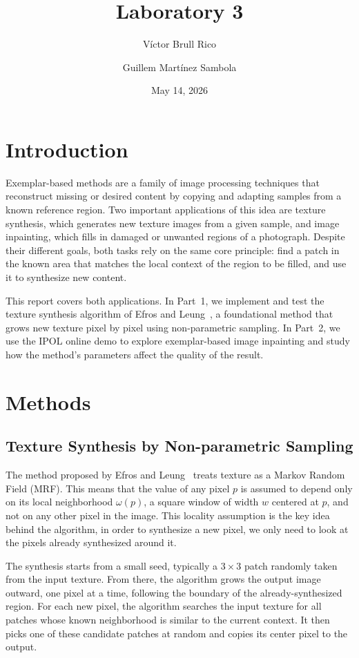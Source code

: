 \documentclass{article}
\title{Laboratory 3}
\author{Víctor Brull Rico \and Guillem Martínez Sambola}
\date{May 14, 2026}
\begin{document}
\maketitle

\section{Introduction}

Exemplar-based methods are a family of image processing techniques that reconstruct missing or desired content by copying and adapting samples from a known reference region. Two important applications of this idea are texture synthesis, which generates new texture images from a given sample, and image inpainting, which fills in damaged or unwanted regions of a photograph. Despite their different goals, both tasks rely on the same core principle: find a patch in the known area that matches the local context of the region to be filled, and use it to synthesize new content.

This report covers both applications. In Part~1, we implement and test the texture synthesis algorithm of Efros and Leung~\cite{efros1999}, a foundational method that grows new texture pixel by pixel using non-parametric sampling. In Part~2, we use the IPOL online demo to explore exemplar-based image inpainting and study how the method's parameters affect the quality of the result.

\section{Methods}
\label{sec:Methods}

\subsection{Texture Synthesis by Non-parametric Sampling}

The method proposed by Efros and Leung~\cite{efros1999} treats texture as a Markov Random Field (MRF). This means that the value of any pixel $p$ is assumed to depend only on its local neighborhood $\omega(p)$, a square window of width $w$ centered at $p$, and not on any other pixel in the image. This locality assumption is the key idea behind the algorithm, in order to synthesize a new pixel, we only need to look at the pixels already synthesized around it.

The synthesis starts from a small seed, typically a $3 \times 3$ patch randomly taken from the input texture. From there, the algorithm grows the output image outward, one pixel at a time, following the boundary of the already-synthesized region. For each new pixel, the algorithm searches the input texture for all patches whose known neighborhood is similar to the current context. It then picks one of these candidate patches at random and copies its center pixel to the output.
\end{document}
